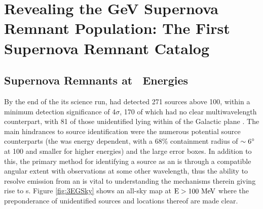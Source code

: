 \chapter{Revealing the GeV Supernova Remnant Population: The First \FermiLat{} Supernova Remnant Catalog}
\label{chap:snrCat}


\section{\label{snrCat:latGam}Supernova Remnants at \gam~Energies}

By the end of the its science run, \egret{} had detected 271 sources above 100\mev{}, within a minimum detection significance of 4$\sigma$, 170 of which had no clear multiwavelength counterpart, with 81 of those unidentified lying within \blat of the Galactic plane \citep{Hartman99}. The main hindrances to source identification were the numerous potential source counterparts (the \egret{} \psf{} was energy dependent, with a 68\% containment radius of ${\rm \sim 6 ^\circ}$ at 100\mev{} and smaller for higher energies) and the large \egret{} error boxes. In addition to this, the primary method for identifying a \gam{} source as an \snr{} is through a compatible angular extent with  observations at some other wavelength, thus the ability to resolve emission from an \snr{} is vital to understanding the mechanisms therein giving rise to \gam{}s. Figure \ref{fig:3EGSky} shows an \egret{} all-sky map at ${\rm E > 100 ~\mathrm{MeV}}$ where the preponderance of unidentified sources and locations thereof are made clear.


